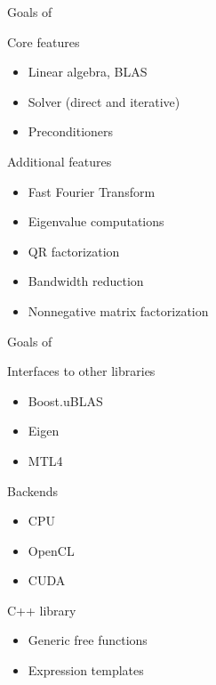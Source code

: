 \begin{frame}{Goals of \ViennaCL}

  \begin{block}{Core features}
    \begin{itemize}
     \item Linear algebra, BLAS
     \item Solver (direct and iterative)
     \item Preconditioners
    \end{itemize}   
  \end{block}
     
  \begin{block}{Additional features}
    \begin{itemize}
     \item Fast Fourier Transform
     \item Eigenvalue computations
     \item QR factorization
     \item Bandwidth reduction
     \item Nonnegative matrix factorization
    \end{itemize}   
  \end{block}

\end{frame}



\begin{frame}{Goals of \ViennaCL}

  \begin{block}{Interfaces to other libraries}
    \begin{itemize}
     \item Boost.uBLAS
     \item Eigen
     \item MTL4
    \end{itemize}   
  \end{block}

  \begin{block}{Backends}
   \begin{itemize}
    \item CPU
    \item OpenCL
    \item CUDA
   \end{itemize}
  \end{block}

  \begin{block}{C++ library}
   \begin{itemize}
    \item Generic free functions
    \item Expression templates
   \end{itemize}
  \end{block}

\end{frame}



